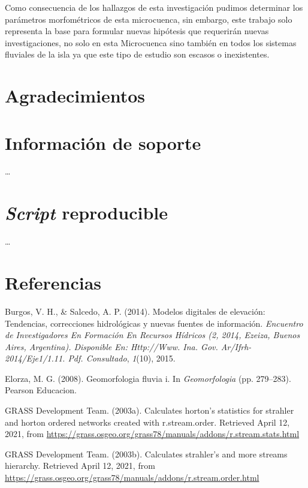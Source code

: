 \documentclass[11pt,]{article}
\begin{document}
Como consecuencia de los hallazgos de esta investigación pudimos
determinar los parámetros morfométricos de esta microcuenca, sin
embargo, este trabajo solo representa la base para formular nuevas
hipótesis que requerirán nuevas investigaciones, no solo en esta
Microcuenca sino también en todos los sistemas fluviales de la isla ya
que este tipo de estudio son escasos o inexistentes.

\section{Agradecimientos}\label{agradecimientos}

\section{Información de soporte}\label{informaciuxf3n-de-soporte}

\ldots

\section{\texorpdfstring{\emph{Script}
reproducible}{Script reproducible}}\label{script-reproducible}

\ldots

\section*{Referencias}\label{referencias}

\hypertarget{refs}{}
\hypertarget{ref-burgos2014modelos}{}
Burgos, V. H., \& Salcedo, A. P. (2014). Modelos digitales de elevación:
Tendencias, correcciones hidrológicas y nuevas fuentes de información.
\emph{Encuentro de Investigadores En Formación En Recursos Hídricos (2,
2014, Ezeiza, Buenos Aires, Argentina). Disponible En: Http://Www. Ina.
Gov. Ar/Ifrh-2014/Eje1/1.11. Pdf. Consultado}, \emph{1}(10), 2015.

\hypertarget{ref-GutierrezElorza}{}
Elorza, M. G. (2008). Geomorfologia fluvia i. In \emph{Geomorfologia}
(pp. 279--283). Pearson Educacion.

\hypertarget{ref-addonrstreamstats}{}
GRASS Development Team. (2003a). Calculates horton's statistics for
strahler and horton ordered networks created with r.stream.order.
Retrieved April 12, 2021, from
\url{https://grass.osgeo.org/grass78/manuals/addons/r.stream.stats.html}

\hypertarget{ref-addonrstreamorder}{}
GRASS Development Team. (2003b). Calculates strahler's and more streams
hierarchy. Retrieved April 12, 2021, from
\url{https://grass.osgeo.org/grass78/manuals/addons/r.stream.order.html}
\end{document}
